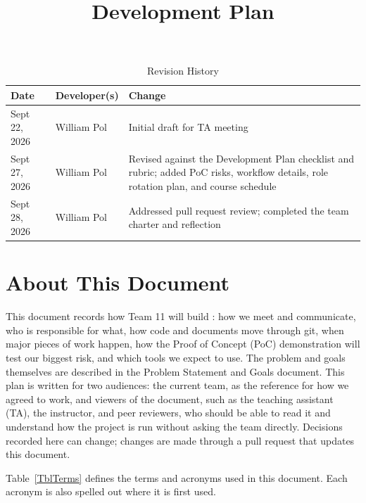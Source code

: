 \documentclass{article}
\title{Development Plan\\\progname}
\author{\authname}
\date{}
\begin{document}
\maketitle

\begin{table}[hp]
\caption{Revision History} \label{TblRevisionHistory}
\begin{tabularx}{\textwidth}{llX}
\toprule
\textbf{Date} & \textbf{Developer(s)} & \textbf{Change}\\
\midrule
Sept 22, 2026 & William Pol & Initial draft for TA meeting\\
Sept 27, 2026 & William Pol & Revised against the Development Plan checklist
and rubric; added PoC risks, workflow details, role rotation plan, and
course schedule\\
Sept 28, 2026 & William Pol & Addressed pull request review; completed
the team charter and reflection\\
\bottomrule
\end{tabularx}
\end{table}

\newpage{}

\section*{About This Document}

This document records how Team 11 will build \progname{}: how we meet and
communicate, who is responsible for what, how code and documents move
through git, when major pieces of work happen, how the Proof of Concept
(PoC) demonstration will test our biggest risk, and which tools we expect
to use. The problem and goals themselves are described in the Problem
Statement and Goals document. This plan is written for two audiences: the
current team, as the reference for how we agreed to work, and viewers of
the document, such as the teaching assistant (TA), the instructor, and
peer reviewers, who
should be able to read it and understand how the project is run without
asking the team directly. Decisions recorded here can change; changes are
made through a pull request that updates this document.

Table~\ref{TblTerms} defines the terms and acronyms used in this
document. Each acronym is also spelled out where it is first used.
\end{document}
